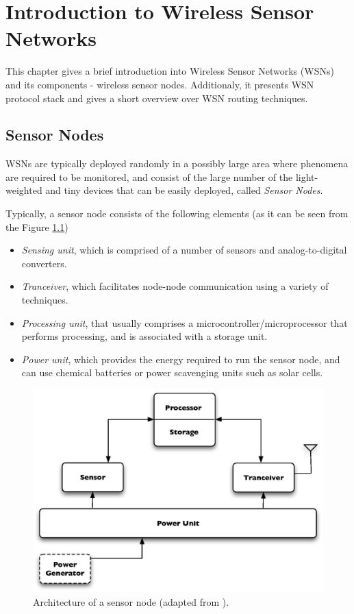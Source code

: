 \chapter{Introduction to Wireless Sensor Networks}



This chapter gives a brief introduction into Wireless Sensor Networks (WSNs)
and its components - wireless sensor nodes. Additionaly, it presents WSN protocol stack 
and gives a short overview over WSN routing techniques.


\section{Sensor Nodes} \label{subsec:sensornodes}
WSNs are typically deployed randomly in a possibly
large area where phenomena are required to be monitored, and consist of the
large number of the light-weighted and tiny devices that can be
easily deployed, called \emph{Sensor Nodes}. 

Typically, a sensor node consists of the following elements (as it can be seen
from the Figure \ref{Fig:SensorNodeArch})
\begin{itemize}
  \item \emph{Sensing unit}, which is comprised of a number of sensors and
  analog-to-digital converters. 
  \item \emph{Tranceiver}, which facilitates node-node communication using 
a variety of techniques.
  \item \emph{Processing unit}, that usually comprises a 
microcontroller/microprocessor that performs processing, and is associated with 
a storage unit.
  \item \emph{Power unit}, which provides the energy required to run the sensor node, and can use chemical 
batteries or power scavenging units such as solar cells.
\end{itemize}

\begin{figure}[h]
\centering
\includegraphics[scale=0.65]{img/SensorNodeArch.eps} 
\caption[Architecture of a sensor node] {Architecture of a sensor node (adapted from \cite{SensorSurveyAkyildiz:2002}).}
\label{Fig:SensorNodeArch}
\end{figure} 

